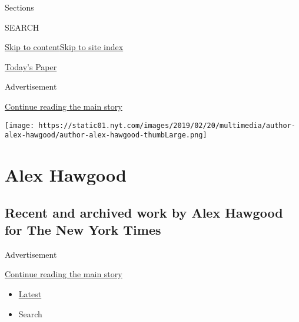 Sections

SEARCH

\protect\hyperlink{site-content}{Skip to
content}\protect\hyperlink{site-index}{Skip to site index}

\href{https://myaccount.nytimes.com/auth/login?response_type=cookie\&client_id=vi}{}

\href{https://www.nytimes.com/section/todayspaper}{Today's Paper}

Advertisement

\protect\hyperlink{after-top}{Continue reading the main story}

\texttt{[image: https://static01.nyt.com/images/2019/02/20/multimedia/author-alex-hawgood/author-alex-hawgood-thumbLarge.png]}

\hypertarget{alex-hawgood}{%
\section{Alex Hawgood}\label{alex-hawgood}}

\hypertarget{recent-and-archived-work-by-alex-hawgood-for-the-new-york-times}{%
\subsection{Recent and archived work by Alex Hawgood for The New York
Times}\label{recent-and-archived-work-by-alex-hawgood-for-the-new-york-times}}

Advertisement

\protect\hyperlink{after-mid1}{Continue reading the main story}

\begin{itemize}
\tightlist
\item
  \protect\hyperlink{stream-panel}{Latest}
\item
  Search
\end{itemize}

